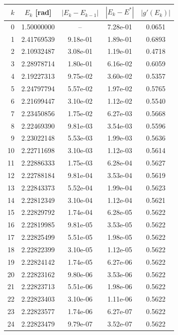 \begin{tabular}{r c c c c}
\toprule
$k$ & $E_k$ [rad] & $|E_k-E_{k-1}|$ & $|E_k-E^*|$ & $|g'(E_k)|$\\
\midrule
0 & 1.50000000 & -- & 7.28e-01 & 0.0651\\
1 & 2.41769539 & 9.18e-01 & 1.89e-01 & 0.6893\\
2 & 2.10932487 & 3.08e-01 & 1.19e-01 & 0.4718\\
3 & 2.28978714 & 1.80e-01 & 6.16e-02 & 0.6059\\
4 & 2.19227313 & 9.75e-02 & 3.60e-02 & 0.5357\\
5 & 2.24797794 & 5.57e-02 & 1.97e-02 & 0.5765\\
6 & 2.21699447 & 3.10e-02 & 1.12e-02 & 0.5540\\
7 & 2.23450856 & 1.75e-02 & 6.27e-03 & 0.5668\\
8 & 2.22469390 & 9.81e-03 & 3.54e-03 & 0.5596\\
9 & 2.23022148 & 5.53e-03 & 1.99e-03 & 0.5636\\
10 & 2.22711698 & 3.10e-03 & 1.12e-03 & 0.5614\\
11 & 2.22886333 & 1.75e-03 & 6.28e-04 & 0.5627\\
12 & 2.22788184 & 9.81e-04 & 3.53e-04 & 0.5619\\
13 & 2.22843373 & 5.52e-04 & 1.99e-04 & 0.5623\\
14 & 2.22812349 & 3.10e-04 & 1.12e-04 & 0.5621\\
15 & 2.22829792 & 1.74e-04 & 6.28e-05 & 0.5622\\
16 & 2.22819985 & 9.81e-05 & 3.53e-05 & 0.5622\\
17 & 2.22825499 & 5.51e-05 & 1.98e-05 & 0.5622\\
18 & 2.22822399 & 3.10e-05 & 1.12e-05 & 0.5622\\
19 & 2.22824142 & 1.74e-05 & 6.27e-06 & 0.5622\\
20 & 2.22823162 & 9.80e-06 & 3.53e-06 & 0.5622\\
21 & 2.22823713 & 5.51e-06 & 1.98e-06 & 0.5622\\
22 & 2.22823403 & 3.10e-06 & 1.11e-06 & 0.5622\\
23 & 2.22823577 & 1.74e-06 & 6.27e-07 & 0.5622\\
24 & 2.22823479 & 9.79e-07 & 3.52e-07 & 0.5622\\
\bottomrule
\end{tabular}
